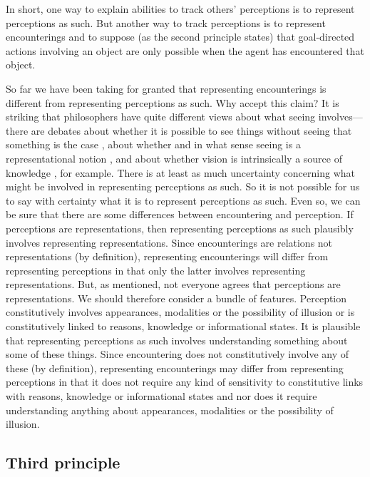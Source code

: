 \documentclass[12pt,\papersize]{extarticle}
\begin{document}
In short, 
one way to explain abilities to track others' perceptions  is to represent perceptions as such.
But another way to track perceptions is to represent encounterings and to suppose (as the second principle states) that goal-directed actions involving an object are only possible when the agent has encountered that object.


So far we have been taking for granted that representing encounterings is different from representing perceptions as such.
Why accept this claim? 
It is striking that philosophers have quite different views about what seeing involves—there are debates about whether it is possible to see things without seeing that something is the case \citep[e.g.][]{en_1671}, about whether and in what sense seeing is a representational notion \citep[]{en_1619, en_1705}, and about whether vision is intrinsically a source of knowledge \citep[]{en_1706}, for example.  
There is at least as much uncertainty concerning what might be involved in representing perceptions as such. 
So it is not possible for us to say with certainty what it is to represent perceptions as such.  
Even so, we can be sure that there are some differences between encountering and perception.
If perceptions are representations, then representing perceptions as such plausibly involves representing representations.
Since encounterings are relations not representations (by definition), representing encounterings will  differ from representing perceptions in that only the latter involves representing representations.
But, as mentioned, not everyone agrees that perceptions are representations.
We should therefore consider a bundle of features.
Perception constitutively involves appearances, modalities or the possibility of illusion or is constitutively linked to reasons, knowledge or informational states.
It is plausible that representing perceptions as such involves understanding something about some of these things.
Since encountering does not constitutively involve any of these (by definition), 
representing encounterings may differ from representing perceptions in that it does not require any kind of sensitivity to constitutive links with reasons, knowledge or informational states and nor does it require understanding  anything about appearances, modalities or the possibility of illusion.



\subsection{Third principle}
\end{document}
